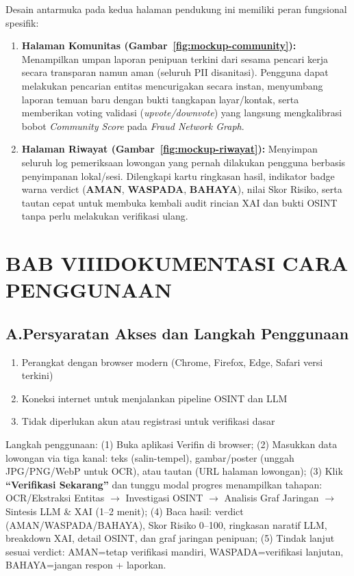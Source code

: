 \documentclass[12pt,a4paper]{article}
\begin{document}
\noindent Desain antarmuka pada kedua halaman pendukung ini memiliki peran fungsional spesifik:
\begin{enumerate}[label=\textbf{\arabic*.}]
\item \textbf{Halaman Komunitas (Gambar~\ref{fig:mockup-community}):} Menampilkan umpan laporan penipuan terkini
      dari sesama pencari kerja secara transparan namun aman (seluruh PII disanitasi). Pengguna dapat melakukan
      pencarian entitas mencurigakan secara instan, menyumbang laporan temuan baru dengan bukti tangkapan layar/kontak,
      serta memberikan voting validasi (\textit{upvote/downvote}) yang langsung mengkalibrasi bobot \textit{Community Score}
      pada \textit{Fraud Network Graph}.
\item \textbf{Halaman Riwayat (Gambar~\ref{fig:mockup-riwayat}):} Menyimpan seluruh log pemeriksaan lowongan
      yang pernah dilakukan pengguna berbasis penyimpanan lokal/sesi. Dilengkapi kartu ringkasan hasil, indikator badge
      warna verdict (\textbf{AMAN}, \textbf{WASPADA}, \textbf{BAHAYA}), nilai Skor Risiko, serta tautan cepat untuk
      membuka kembali audit rincian XAI dan bukti OSINT tanpa perlu melakukan verifikasi ulang.
\end{enumerate}

\section*{BAB VIII\quad DOKUMENTASI CARA PENGGUNAAN}

\subsection*{A.\quad Persyaratan Akses dan Langkah Penggunaan}

\begin{enumerate}[label=\textbf{\arabic*.}]
  \item Perangkat dengan browser modern (Chrome, Firefox, Edge, Safari versi terkini)
  \item Koneksi internet untuk menjalankan pipeline OSINT dan LLM
  \item Tidak diperlukan akun atau registrasi untuk verifikasi dasar
\end{enumerate}

Langkah penggunaan: (1) Buka aplikasi Verifin di browser; (2) Masukkan data lowongan via tiga kanal: teks (salin-tempel), gambar/poster (unggah JPG/PNG/WebP untuk OCR), atau tautan (URL halaman lowongan); (3) Klik \textbf{``Verifikasi Sekarang''} dan tunggu modal progres menampilkan tahapan: OCR/Ekstraksi Entitas $\to$ Investigasi OSINT $\to$ Analisis Graf Jaringan $\to$ Sintesis LLM \& XAI (1--2 menit); (4) Baca hasil: verdict (AMAN/WASPADA/BAHAYA), Skor Risiko 0--100, ringkasan naratif LLM, breakdown XAI, detail OSINT, dan graf jaringan penipuan; (5) Tindak lanjut sesuai verdict: AMAN=tetap verifikasi mandiri, WASPADA=verifikasi lanjutan, BAHAYA=jangan respon + laporkan.
\end{document}
